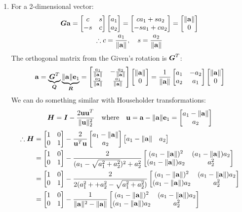 \documentclass[]{exam}
\begin{document}
\begin{questions}
\begin{enumerate}[label=\arabic*.]
	\item For a 2-dimensional vector:
		\begin{gather*}
			\boldsymbol{G} \boldsymbol{\mathrm{a}} = \begin{bmatrix} c & s \\ -s & c \end{bmatrix} \begin{bmatrix} a_1 \\ a_2 \end{bmatrix} = \begin{bmatrix} c a_1 + s a_2 \\ -s a_1 + c a_2 \end{bmatrix} = \begin{bmatrix} \|\boldsymbol{\mathrm{a}}\| \\ 0 \end{bmatrix} \\
			\therefore c = \frac{a_1}{\| \boldsymbol{\mathrm{a}} \|}, \quad s = \frac{a_2}{\| \boldsymbol{\mathrm{a}} \|}
		\end{gather*}
		The orthogonal matrix from the Given's rotation is $\boldsymbol{G}^T$:
		\begin{gather*}
			\boldsymbol{\mathrm{a}} = \underbrace{\boldsymbol{G}^T}_{\boldsymbol{Q}} \underbrace{\| \boldsymbol{\mathrm{a}} \| \boldsymbol{\mathrm{e}}_1}_{\boldsymbol{R}}
			= \begin{bmatrix} \frac{a_1}{\| \boldsymbol{\mathrm{a}} \|} & -\frac{a_2}{\| \boldsymbol{\mathrm{a}} \|} \\ \frac{a_2}{\| \boldsymbol{\mathrm{a}} \|} & \frac{a_1}{\| \boldsymbol{\mathrm{a}} \|} \end{bmatrix} \begin{bmatrix} \|\boldsymbol{\mathrm{a}}\| \\ 0 \end{bmatrix}
			= \frac{1}{\| \boldsymbol{\mathrm{a}} \|} \begin{bmatrix} a_1 & -a_2 \\ a_2 & a_1 \end{bmatrix} \begin{bmatrix} \|\boldsymbol{\mathrm{a}}\| \\ 0 \end{bmatrix}
		\end{gather*}
		We can do something similar with Householder transformations:
		$$
			\boldsymbol{H} = \boldsymbol{I} - \frac{2 \boldsymbol{\mathrm{u}} \boldsymbol{\mathrm{u}}^T}{\|\boldsymbol{\mathrm{u}}\|^2_2} \quad \mathrm{where} \quad \boldsymbol{\mathrm{u}} = \boldsymbol{\mathrm{a}} - \| \boldsymbol{\mathrm{a}} \| \boldsymbol{\mathrm{e}}_1 = \begin{bmatrix} a_1 - \|\boldsymbol{\mathrm{a}}\| \\ a_2 \end{bmatrix}
		$$
		\begin{align*}
			\therefore \mH
			&= \bmat{1 & 0 \\ 0 & 1} - \frac{2}{\vu^T \vu} \bmat{a_1 - \| \va \| \\ a_2} \bmat{a_1 - \| \va \| & a_2} \\
			&= \bmat{1 & 0 \\ 0 & 1} - \frac{2}{(a_1 - \sqrt{a_1^2 + a_2^2})^2 + a_2^2} \bmat{(a_1 - \| \va \|)^2 & (a_1 - \| \va \|) a_2  \\ (a_1 - \| \va \|) a_2 & a_2^2} \\
			&= \bmat{1 & 0 \\ 0 & 1} - \frac{2}{2(a_1^2 + + a_2^2 - \sqrt{a_1^2 + a_2^2})} \bmat{(a_1 - \| \va \|)^2 & (a_1 - \| \va \|) a_2  \\ (a_1 - \| \va \|) a_2 & a_2^2} \\
			&= \bmat{1 & 0 \\ 0 & 1} - \frac{1}{\|\va\|^2 - \|\va\|} \bmat{(a_1 - \| \va \|)^2 & (a_1 - \| \va \|) a_2  \\ (a_1 - \| \va \|) a_2 & a_2^2} \\

\end{align*}
\end{enumerate}
\end{questions}
\end{document}
